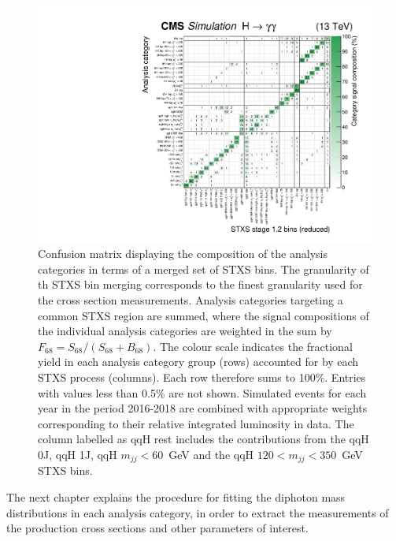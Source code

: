 \begin{figure}[htb!]
  \centering
  \includegraphics[width=.95\textwidth]{Figures/hgg_overview/purityMatrix_merged.pdf}
  \caption[Confusion matrix for the full set of analysis categories]
  {
    Confusion matrix displaying the composition of the analysis categories in terms of a merged set of STXS bins. The granularity of th STXS bin merging corresponds to the finest granularity used for the cross section measurements. Analysis categories targeting a common STXS region are summed, where the signal compositions of the individual analysis categories are weighted in the sum by $F_{68}=S_{68}/(S_{68}+B_{68})$. The colour scale indicates the fractional yield in each analysis category group (rows) accounted for by each STXS process (columns). Each row therefore sums to 100\%. Entries with values less than 0.5\% are not shown. Simulated events for each year in the period 2016-2018 are combined with appropriate weights corresponding to their relative integrated luminosity in data. The column labelled as qqH rest includes the contributions from the qqH 0J, qqH 1J, qqH $m_{jj}<60$~GeV and the qqH $120<m_{jj}<350$~GeV STXS bins.
  }
  \label{fig:purity_matrix}
\end{figure}

The next chapter explains the procedure for fitting the diphoton mass distributions in each analysis category, in order to extract the measurements of the production cross sections and other parameters of interest.







